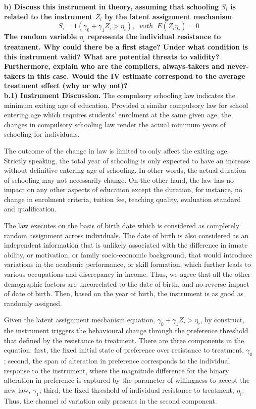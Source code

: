 \documentclass[a4paper,12pt,oneside,English]{article}
\begin{document}
\textbf{b) Discuss this instrument in theory, assuming that schooling $S_i$ is related to the instrument $Z_i$ by the latent assignment mechanism
\begin{equation*}
    S_i = 1(\gamma_0+ \gamma_1 Z_i > \eta_i),\;\; with\;\; E(Z_i \eta _i) = 0
\end{equation*}
The random variable $\eta_i$ represents the individual resistance to treatment. Why could there be a
first stage? Under what condition is this instrument valid? What are potential threats to validity?
Furthermore, explain who are the compliers, always-takers and never-takers in this case. Would the IV estimate correspond to the average treatment effect (why or why not)?}\\

\textbf{b.1) Instrument Discussion.} The compulsory schooling law indicates the minimum exiting age of education. Provided a similar compulsory law for school entering age which requires students’ enrolment at the same given age, the changes in compulsory schooling law render the actual minimum years of schooling for individuals.

The outcome of the change in law is limited to only affect the exiting age. Strictly speaking, the total year of schooling is only expected to have an increase without definitive entering age of schooling. In other words, the actual duration of schooling may not necessarily change. On the other hand, the law has no impact on any other aspects of education except the duration, for instance, no change in enrolment criteria, tuition fee, teaching quality, evaluation standard and qualification.

The law executes on the basis of birth date which is considered as completely random assignment across individuals. The date of birth is also considered as an independent information that is unlikely associated with the difference in innate ability, or motivation, or family socio-economic background, that would introduce variations in the academic performance, or skill formation, which further leads to various occupations and discrepancy in income. Thus, we agree that all the other demographic factors are uncorrelated to the date of birth, and no reverse impact of date of birth. Then, based on the year of birth, the instrument is as good as randomly assigned.

Given the latent assignment mechanism equation, \(\gamma_0+ \gamma_1 Z_i > \eta_i\), by construct, the instrument triggers the behavioural change through the preference threshold that defined by the resistance to treatment. There are three components in the equation: first, the fixed initial state of preference over resistance to treatment, $\gamma_0$; second, the span of alteration in preference corresponds to the individual response to the instrument, where the magnitude difference for the binary alteration in preference is captured by the parameter of willingness to accept the new law, $\gamma_1$; third, the fixed threshold of individual resistance to treatment, $\eta_i$. Thus, the channel of variation only presents in the second component.
\end{document}
